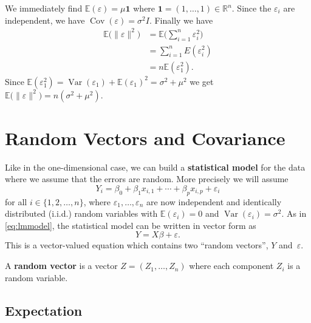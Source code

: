 \documentclass[
  a4paper,
]{article}
\theoremstyle{definition}
\theoremstyle{definition}
\theoremstyle{definition}
\theoremstyle{definition}
\theoremstyle{remark}
\begin{document}
\begin{myanswers}
We immediately find \(\mathbb{E}(\varepsilon) = \mu \mathbf{1}\) where
\(\mathbf{1} = (1, \ldots, 1) \in\mathbb{R}^n\). Since the \(\varepsilon_i\) are independent,
we have \(\mathop{\mathrm{Cov}}(\varepsilon) = \sigma^2 I\). Finally we have
\begin{align*}
  \mathbb{E}\bigl(\|\varepsilon\|^2\bigr)
  &= \mathbb{E}\bigl( \sum_{i=1}^n \varepsilon_i^2 \bigr) \\
  &= \sum_{i=1}^n E(\varepsilon_i^2) \\
  &= n \mathbb{E}(\varepsilon_1^2).
\end{align*}
Since \(\mathbb{E}(\varepsilon_1^2) = \mathop{\mathrm{Var}}(\varepsilon_1) + \mathbb{E}(\varepsilon_1)^2 = \sigma^2 + \mu^2\)
we get \(\mathbb{E}\bigl(\|\varepsilon\|^2\bigr) = n (\sigma^2 + \mu^2)\).

\end{myanswers}

\clearpage

\hypertarget{S03-cov}{%
\section{Random Vectors and Covariance}\label{S03-cov}}

Like in the one-dimensional case, we can build a \textbf{statistical model}
for the data where we assume that the errors are random. More
precisely we will assume
\begin{equation}
  Y_i
  = \beta_0 + \beta_1 x_{i,1} + \cdots + \beta_p x_{i,p} + \varepsilon_i
\end{equation}
for all \(i \in \{1, 2, \ldots, n\}\), where \(\varepsilon_1, \ldots, \varepsilon_n\)
are now independent and identically distributed (i.i.d.)
random variables with \(\mathbb{E}(\varepsilon_i) = 0\) and
\(\mathop{\mathrm{Var}}(\varepsilon_i) = \sigma^2\).
As in \eqref{eq:lmmodel}, the statistical model can be written in vector
form as
\begin{equation}
  Y = X \beta + \varepsilon.  \label{eq:lmstat0}
\end{equation}
This is a vector-valued equation which contains two ``random vectors'', \(Y\)
and~\(\varepsilon\).

A \textbf{random vector} is a vector \(Z = (Z_1, \ldots, Z_n)\)
where each component \(Z_i\) is a random variable.

\hypertarget{expectation}{%
\subsection{Expectation}\label{expectation}}
\end{document}
